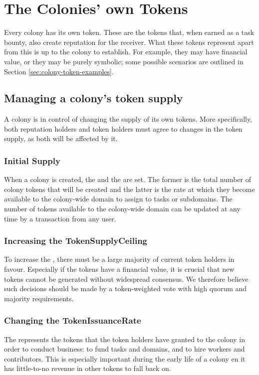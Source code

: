 \section{The Colonies' own Tokens}\label{sec:colony-tokens}
Every colony has its own token. These are the tokens that, when earned as a task bounty, also create reputation for the receiver. What these tokens represent apart from this is up to the colony to establish. For example, they may have financial value, or they may be purely symbolic; some possible scenarios are outlined in Section \ref{sec:colony-token-examples}.

\subsection{Managing a colony's token supply}\label{sec:colony-token-management}
A colony is in control of changing the supply of its own tokens. More specifically, both reputation holders and token holders must agree to changes in the token supply, as both will be affected by it.

\subsubsection{Initial Supply}
When a colony is created, the  and the  are set. The former is the total number of colony tokens that will be created and the latter is the rate at which they become available to the colony-wide domain to assign to tasks or subdomains. The number of tokens available to the colony-wide domain can be updated at any time by a transaction from any user. 

\subsubsection{Increasing the TokenSupplyCeiling}
To increase the , there must be a large majority of current token holders in favour. Especially if the tokens have a financial value, it is crucial that new tokens cannot be generated without widespread consensus. We therefore believe such decisions should be made by a token-weighted vote with high quorum and majority requirements. %


\subsubsection{Changing the TokenIssuanceRate}
The  represents the tokens that the token holders have granted to the colony in order to conduct business: to fund tasks and domains, and to hire workers and contributors. This is especially important during the early life of a colony en it has little-to-no revenue in other tokens to fall back on.

